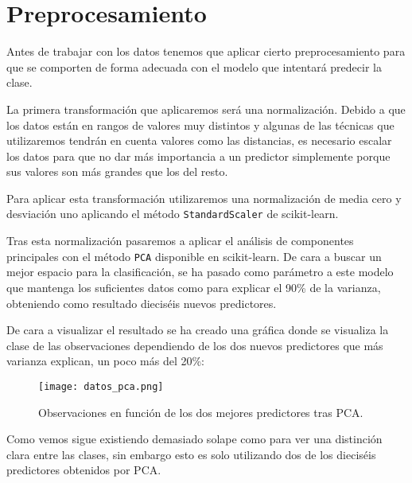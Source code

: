 \section{Preprocesamiento}

Antes de trabajar con los datos tenemos que aplicar cierto preprocesamiento para que se comporten de forma adecuada con el modelo que intentará predecir la clase.


La primera transformación que aplicaremos será una normalización. Debido a que los datos están en rangos de valores muy distintos y algunas de las técnicas que utilizaremos tendrán en cuenta valores como las distancias, es necesario escalar los datos para que no dar más importancia a un predictor simplemente porque sus valores son más grandes que los del resto.

Para aplicar esta transformación utilizaremos una normalización de media cero y desviación uno aplicando el método \texttt{StandardScaler} de scikit-learn.

Tras esta normalización pasaremos a aplicar el análisis de componentes principales con el método \texttt{PCA} disponible en scikit-learn. De cara a buscar un mejor espacio para la clasificación, se ha pasado como parámetro a este modelo que mantenga los suficientes datos como para explicar el 90\% de la varianza, obteniendo como resultado dieciséis nuevos predictores.

De cara a visualizar el resultado se ha creado una gráfica donde se visualiza la clase de las observaciones dependiendo de los dos nuevos predictores que más varianza explican, un poco más del 20\%:

\begin{figure}[H]
	\centering
	\texttt{[image: datos\_pca.png]}
	\caption{Observaciones en función de los dos mejores predictores tras PCA.}
	\label{fig:datos_pca}
\end{figure}

Como vemos sigue existiendo demasiado solape como para ver una distinción clara entre las clases, sin embargo esto es solo utilizando dos de los dieciséis predictores obtenidos por PCA.

\newpage
